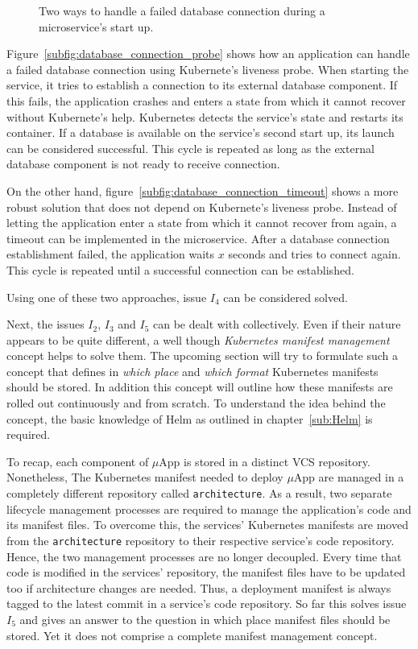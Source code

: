 \begin{figure}[H]
{  }
  \hspace*{\fill}%

  \caption{Two ways to handle a failed database connection during a microservice's start up.}%
  \label{fig:database_connection_start_up}
\end{figure}

Figure~\ref{subfig:database_connection_probe} shows how an application can
handle a failed database connection using Kubernete's liveness probe. When
starting the service, it tries to establish a connection to its external
database component. If this fails, the application crashes and enters a state
from which it cannot recover without Kubernete's help. Kubernetes detects the
service's state and restarts its container. If a database is available on the
service's second start up, its launch can be considered successful. This cycle
is repeated as long as the external database component is not ready to receive
connection.

On the other hand, figure~\ref{subfig:database_connection_timeout} shows a more
robust solution that does not depend on Kubernete's liveness probe. Instead of
letting the application enter a state from which it cannot recover from again,
a timeout can be implemented in the microservice. After a database connection
establishment failed, the application waits $x$ seconds and tries to connect
again. This cycle is repeated until a successful connection can be established.

Using one of these two approaches, issue $I_4$ can be considered solved.

Next, the issues $I_2$, $I_3$ and $I_5$ can be dealt with collectively. Even if
their nature appears to be quite different, a well though \textit{Kubernetes
manifest management} concept helps to solve them. The upcoming section will try
to formulate such a concept that defines in \textit{which place} and
\textit{which format} Kubernetes manifests should be stored. In addition this
concept will outline how these manifests are rolled out continuously and from
scratch. To understand the idea behind the concept, the basic knowledge of Helm
as outlined in chapter~\ref{sub:Helm} is required.

To recap, each component of $\mu$App is stored in a distinct {VCS} repository.
Nonetheless, The Kubernetes manifest needed to deploy $\mu$App are managed in a
completely different repository called \texttt{architecture}. As a result, two
separate lifecycle management processes are required to manage the
application's code and its manifest files. To overcome this, the services'
Kubernetes manifests are moved from the \texttt{architecture} repository to
their respective service's code repository. Hence, the two management processes
are no longer decoupled. Every time that code is modified in the services'
repository, the manifest files have to be updated too if architecture changes
are needed. Thus, a deployment manifest is always tagged to the latest commit
in a service's code repository. So far this solves issue $I_5$ and gives an
answer to the question in which place manifest files should be stored. Yet it
does not comprise a complete manifest management concept.


